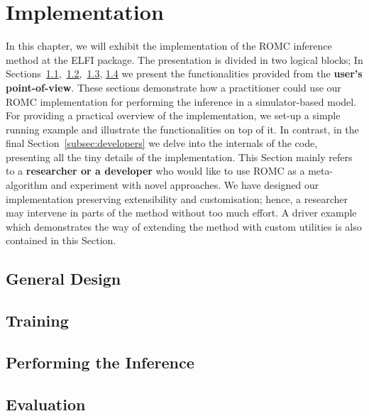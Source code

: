 \documentclass[11pt,twoside]{article}
\numberwithin{Theorem}{section}
\numberwithin{Definition}{section}
\numberwithin{Lemma}{section}
\numberwithin{Algorithm}{section}
\numberwithin{equation}{section}
\begin{document}
\section{Implementation}
In this chapter, we will exhibit the implementation of the ROMC
inference method at the ELFI package. The presentation is divided in
two logical blocks; In
Sections~\ref{subsec:general_design},~\ref{subsec:training},~\ref{subsec:inference},
\ref{subsec:evaluation} we present the functionalities provided from
the \textbf{user's point-of-view}. These sections demonstrate how a
practitioner could use our ROMC implementation for performing the
inference in a simulator-based model. For providing a practical
overview of the implementation, we set-up a simple running example and
illustrate the functionalities on top of it. In contrast, in the final
Section~\ref{subsec:developers} we delve into the internals of the
code, presenting all the tiny details of the implementation. This
Section mainly refers to a \textbf{researcher or a developer} who
would like to use ROMC as a meta-algorithm and experiment with novel
approaches. We have designed our implementation preserving
extensibility and customisation; hence, a researcher may intervene in
parts of the method without too much effort. A driver example which
demonstrates the way of extending the method with custom utilities is
also contained in this Section.

\subsection{General Design}
\label{subsec:general_design}
% 


\subsection{Training}
\label{subsec:training}


\subsection{Performing the Inference}
\label{subsec:inference}


\subsection{Evaluation}
\label{subsec:evaluation}

\end{document}
